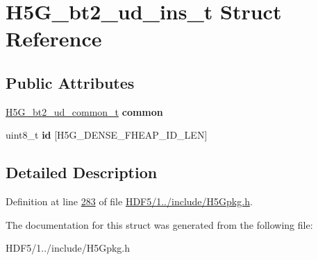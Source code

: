 \hypertarget{struct_h5_g__bt2__ud__ins__t}{}\section{H5\+G\+\_\+bt2\+\_\+ud\+\_\+ins\+\_\+t Struct Reference}
\label{struct_h5_g__bt2__ud__ins__t}
\subsection*{Public Attributes}
\begin{DoxyCompactItemize}
\item 
\mbox{\label{struct_h5_g__bt2__ud__ins__t_a0ccc8777044840541df4c4e0ed50361f}} 
\hyperlink{struct_h5_g__bt2__ud__common__t}{H5\+G\+\_\+bt2\+\_\+ud\+\_\+common\+\_\+t} {\bfseries common}
\item 
\mbox{\label{struct_h5_g__bt2__ud__ins__t_a5306c0c0b0cd9c1d2024ca0c8263fa1f}} 
uint8\+\_\+t {\bfseries id} \mbox{[}H5\+G\+\_\+\+D\+E\+N\+S\+E\+\_\+\+F\+H\+E\+A\+P\+\_\+\+I\+D\+\_\+\+L\+EN\mbox{]}
\end{DoxyCompactItemize}


\subsection{Detailed Description}


Definition at line \hyperlink{_h_d_f5_21_810_81_2include_2_h5_gpkg_8h_source_l00283}{283} of file \hyperlink{_h_d_f5_21_810_81_2include_2_h5_gpkg_8h_source}{H\+D\+F5/1../include/\+H5\+Gpkg.\+h}.



The documentation for this struct was generated from the following file\+:\begin{DoxyCompactItemize}
\item 
H\+D\+F5/1../include/\+H5\+Gpkg.\+h\end{DoxyCompactItemize}
